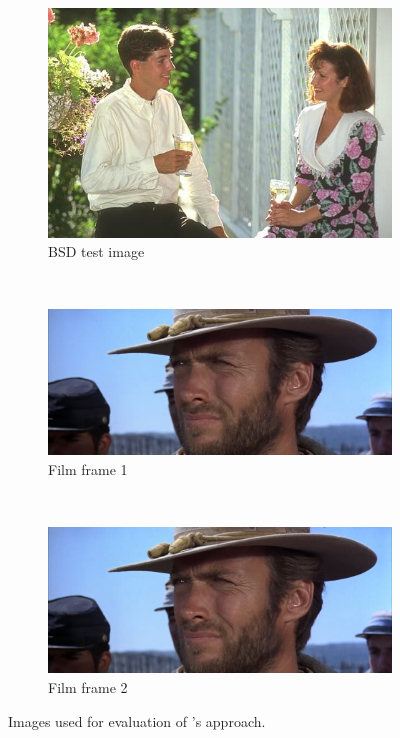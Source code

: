 \documentclass{mpaper}
\begin{document}
\begin{figure}
	\centering
	\begin{subfigure}[b]{0.22\textwidth}
		\includegraphics[width=\textwidth]{images/bsd-157055}
		\caption{BSD test image}
		\label{fig:explor-bsd}
	\end{subfigure}
	~
	\begin{subfigure}[b]{0.35\textwidth}
		\includegraphics[width=\textwidth]{images/gbu2}
		\caption{Film frame 1}
		\label{fig:explor-ff1}
	\end{subfigure}
	~
	\begin{subfigure}[b]{0.35\textwidth}
		\includegraphics[width=\textwidth]{images/gbu3}
		\caption{Film frame 2}
		\label{fig:explor-ff2}
	\end{subfigure}
	
	\vspace{0.5em}
	
	\caption{
		Images used for evaluation of \citeauthor{Plane-Graphs-From-Images}'s \cite{Plane-Graphs-From-Images} approach.
	}
\end{figure}
\end{document}
